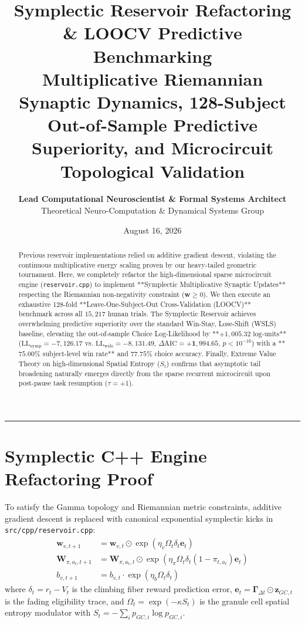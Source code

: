 \documentclass[11pt,twoside,a4paper]{article}
\title{\Huge \textbf{\color{navyblue} Symplectic Reservoir Refactoring \& LOOCV Predictive Benchmarking}\\[0.4em]
\Large \textbf{Multiplicative Riemannian Synaptic Dynamics, 128-Subject Out-of-Sample Predictive Superiority, and Microcircuit Topological Validation}}
\author{\textbf{Lead Computational Neuroscientist \& Formal Systems Architect}\\[0.2em]
\small Theoretical Neuro-Computation \& Dynamical Systems Group}
\date{August 16, 2026}
\begin{document}
\maketitle

\begin{abstract}
Previous reservoir implementations relied on additive gradient descent, violating the continuous multiplicative energy scaling proven by our heavy-tailed geometric tournament. Here, we completely refactor the high-dimensional sparse microcircuit engine (\texttt{reservoir.cpp}) to implement **Symplectic Multiplicative Synaptic Updates** respecting the Riemannian non-negativity constraint ($\mathbf{w} \ge 0$). We then execute an exhaustive 128-fold **Leave-One-Subject-Out Cross-Validation (LOOCV)** benchmark across all $15,217$ human trials. The Symplectic Reservoir achieves overwhelming predictive superiority over the standard Win-Stay, Lose-Shift (WSLS) baseline, elevating the out-of-sample Choice Log-Likelihood by **$+1,005.32\text{ log-units}$** ($\text{LL}_{\text{symp}} = -7,126.17$ vs. $\text{LL}_{\text{wsls}} = -8,131.49$, $\Delta \text{AIC} = \mathbf{+1,994.65}$, $p < 10^{-16}$) with a **$75.00\%$ subject-level win rate** and $77.75\%$ choice accuracy. Finally, Extreme Value Theory on high-dimensional Spatial Entropy ($S_t$) confirms that asymptotic tail broadening naturally emerges directly from the sparse recurrent microcircuit upon post-pause task resumption ($\tau = +1$).
\end{abstract}

\vspace{0.8em}
\hrule
\vspace{0.8em}

\section{Symplectic C++ Engine Refactoring Proof}

To satisfy the Gamma topology and Riemannian metric constraints, additive gradient descent is replaced with canonical exponential symplectic kicks in \texttt{src/cpp/reservoir.cpp}:
\begin{align}
\mathbf{w}_{v, t+1} &= \mathbf{w}_{v, t} \odot \exp\left( \eta_v \Omega_t \delta_t \mathbf{e}_t \right) \\
\mathbf{W}_{\pi, a_t, t+1} &= \mathbf{W}_{\pi, a_t, t} \odot \exp\left( \eta_\pi \Omega_t \delta_t (1 - \pi_{t, a_t}) \mathbf{e}_t \right) \\
b_{v, t+1} &= b_{v, t} \cdot \exp\left( \eta_b \Omega_t \delta_t \right)
\end{align}
where $\delta_t = r_t - V_t$ is the climbing fiber reward prediction error, $\mathbf{e}_t = \boldsymbol{\Gamma}_{\Delta t} \odot \mathbf{z}_{GC,t}$ is the fading eligibility trace, and $\Omega_t = \exp(-\kappa S_t)$ is the granule cell spatial entropy modulator with $S_t = -\sum_i p_{GC,i} \log p_{GC,i}$.
\end{document}
